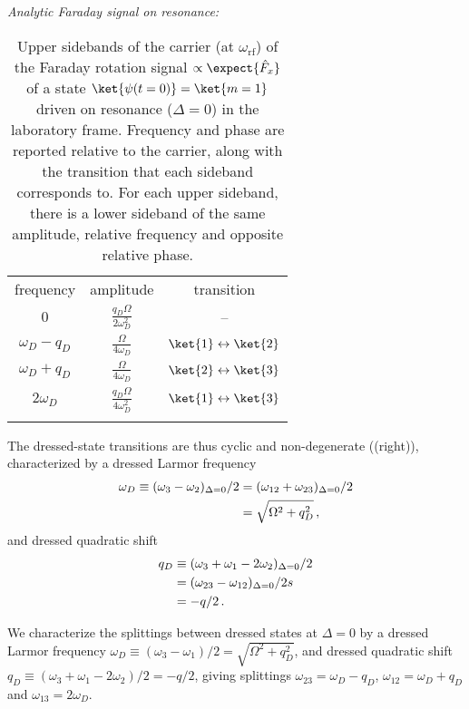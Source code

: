 \textit{Analytic Faraday signal on resonance:}
\begin{table}[t]
    \caption{Upper sidebands of the carrier (at $\omega_{\text{rf}}$) of the Faraday rotation signal $\propto \expect{\hat{F}_x}$ of a state $\ket{\psi(t=0)}=\ket{m=1}$ driven on resonance ($\Delta = 0$) in the laboratory frame. Frequency and phase are reported relative to the carrier, along with the transition that each sideband corresponds to. For each upper sideband, there is a lower sideband of the same amplitude, relative frequency and opposite \note{$\pi$} relative phase.}
    \label{tab:sidebands}
    \begin{tabular}{ccc}
    \hhline{===}
    frequency & amplitude & transition \\ \hhline{---}
     $0$ & $\frac{q_D \Omega }{2 \omega_D^2}$ & -- \\
     $\omega_D-q_D$ & $\frac{\Omega}{4 \omega_D}$ & $\ket{1} \leftrightarrow \ket{2}$ \\
     $\omega_D+q_D$ & $\frac{\Omega}{4 \omega_D}$ & $\ket{2} \leftrightarrow \ket{3}$\\
     $2 \omega_D$ & $\frac{q_D \Omega}{4 \omega_D^2}$ & $\ket{1} \leftrightarrow \ket{3}$ \\ \hhline{===}
    \end{tabular}
\end{table}


The dressed-state transitions are thus cyclic and non-degenerate ((right)), characterized by a dressed Larmor frequency
\begin{align}
\label{eq:dressed_larmor}
   \omega_D \equiv (\omega_3 - \omega_2)_{\Delta=0}/2 &= (\omega_{12} + \omega_{23})_{\Delta=0}/2 \notag\\ &= \sqrt{\Omega^2 + q_D^2}\, ,
\end{align}
and dressed quadratic shift
\begin{align}
\label{eq:dressed_quadratic}
   q_D &\equiv (\omega_3 + \omega_1 -2\omega_2)_{\Delta=0}/2 \notag\\
       &= (\omega_{23}-\omega_{12})_{\Delta=0}/2 \notag s\\ 
       &= -q/2 \, .
\end{align}

We characterize the splittings between dressed states at $\Delta=0$ by a dressed Larmor frequency $\omega_D\equiv(\omega_3-\omega_1)/2=\sqrt{\Omega^2+q_D^2}$, and dressed quadratic shift $q_D \equiv (\omega_3 + \omega_1 -2\omega_2)/2=-q/2$, giving splittings $\omega_{23}=\omega_D-q_D$, $\omega_{12}=\omega_D+q_D$ and $\omega_{13}=2\omega_D$.


